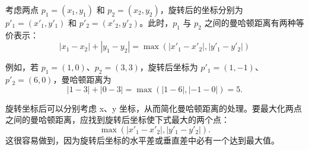 考虑两点 $p_1=(x_1,y_1)$ 和 $p_2=(x_2,y_2)$，旋转后的坐标分别为 $p'_1=(x'_1,y'_1)$ 和 $p'_2=(x'_2,y'_2)$。此时，$p_1$ 与 $p_2$ 之间的曼哈顿距离有两种等价表示：
\[|x_1-x_2|+|y_1-y_2| = \max(|x'_1-x'_2|,|y'_1-y'_2|)\]

例如，若 $p_1=(1,0)$、$p_2=(3,3)$，旋转后坐标为 $p'_1=(1,-1)$、$p'_2=(6,0)$，曼哈顿距离为
\[|1-3|+|0-3| = \max(|1-6|,|-1-0|) = 5.\]

旋转坐标后可以分别考虑 x、y 坐标，从而简化曼哈顿距离的处理。要最大化两点之间的曼哈顿距离，应找到旋转后坐标使下式最大的两个点：
\[\max(|x'_1-x'_2|,|y'_1-y'_2|).\]
这很容易做到，因为旋转后坐标的水平差或垂直差中必有一个达到最大值。
